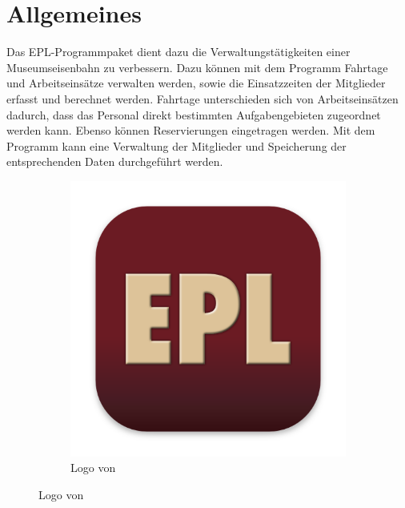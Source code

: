 \chapter{Allgemeines}\label{epl:allg}
Das EPL-Programmpaket dient dazu die Verwaltungstätigkeiten einer Museumseisenbahn zu verbessern.
Dazu können mit dem Programm \Einsatz Fahrtage und Arbeitseinsätze verwalten werden,
sowie die Einsatzzeiten der Mitglieder erfasst und berechnet werden.
Fahrtage unterschieden sich von Arbeitseinsätzen dadurch, dass das Personal direkt bestimmten Aufgabengebieten zugeordnet werden kann.
Ebenso können Reservierungen eingetragen werden.
Mit dem Programm \Personal kann eine Verwaltung der Mitglieder und Speicherung der entsprechenden Daten durchgeführt werden.

\begin{figure}[h]
  \centering
  \begin{subfigure}{0.3\textwidth}
    \includegraphics[width=\textwidth]{../../Icon/EPL.png}
    \caption{Logo von \EPL}
  \end{subfigure}


\end{figure}
